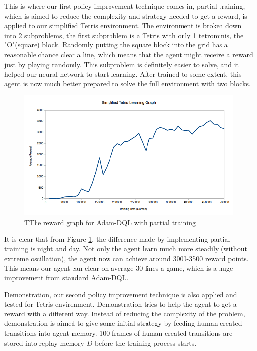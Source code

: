    \par 
    This is where our first policy improvement technique comes in, partial training, which is aimed to reduce the complexity and strategy needed to get a reward, is applied to our simplified Tetris environment. The environment is broken down into 2 subproblems, the first subproblem is a Tetris with only 1 tetrominis, the "O"(square) block. Randomly putting the square block into the grid has a reasonable chance clear a line, which means that the agent might receive a reward just by playing randomly. This subproblem is definitely easier to solve, and it helped our neural network to start learning. After trained to some extent, this agent is now much better prepared to solve the full environment with two blocks.
    
    
     \begin{figure}[H]
        \centering
        \includegraphics[scale=0.5]{images/tetrisreward2.png}
        \caption{TThe reward graph for Adam-DQL with partial training}
        \label{fig:tetris2}
    \end{figure}
    
    It is clear that from Figure \ref{fig:tetris2}, the difference made by implementing partial training is night and day. Not only the agent learn much more steadily (without extreme oscillation), the agent now can achieve around 3000-3500 reward points. This means our agent can clear on average 30 lines a game, which is a huge improvement from standard Adam-DQL.
    \par
    Demonstration, our second policy improvement technique is also applied and tested for Tetris environment. Demonstration tries to help the agent to get a reward with a different way. Instead of reducing the complexity of the problem, demonstration is aimed to give some initial strategy by feeding human-created transitions into agent memory. 100 frames of human-created transitions are stored into replay memory $D$ before the training process starts.
    
